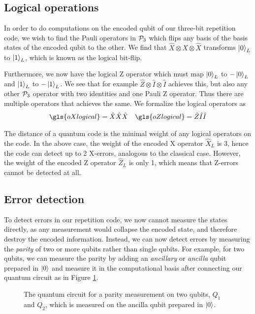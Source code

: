 \subsection{Logical operations}

In order to do computations on the encoded qubit of our three-bit repetition code, we wish to find the Pauli operators in $\mathcal{P}_3$ which flips any basis of the basis states of the encoded qubit to the other. We find that $\hat{X}\otimes \hat{X}\otimes \hat{X}$ transforms $\ket{0}_L$ to $\ket{1}_L$, which is known as the logical bit-flip.

Furthermore, we now have the logical Z operator which must map $\ket{0}_L$ to $-\ket{0}_L$ and $\ket{1}_L$ to $-\ket{1}_L$. We see that for example $\hat{Z}\otimes \hat{I}\otimes \hat{I}$ achieves this, but also any other $\mathcal{P}_3$ operator with two identities and one Pauli Z operator. Thus there are multiple operators that achieves the same. We formalize the logical operators as
\begin{align}\label{eq:qec_3bitlogical}
  \gls{oXlogical} = \hat{X}\hat{X}\hat{X} && \gls{oZlogical} = \hat{Z}\hat{I}\hat{I}
\end{align}

The distance of a quantum code is the minimal weight of any logical operators on the code. In the above case, the weight of the encoded X operator $\hat{X}_L$ is 3, hence the code can detect up to 2 X-errors, analogous to the classical case. However, the weight of the encoded Z operator $\hat{Z}_L$ is only 1, which means that Z-errors cannot be detected at all.

\subsection{Error detection}

To detect errors in our repetition code, we now cannot measure the states directly, as any measurement would collapse the encoded state, and therefore destroy the encoded information. Instead, we can now detect errors by measuring the \emph{parity} of two or more qubits rather than single qubits. For example, for two qubits, we can measure the parity by adding an \emph{ancillary} or \emph{ancilla} qubit prepared in $\ket{0}$ and measure it in the computational basis after connecting our quantum circuit as in Figure \ref{fig:2qubitparity}. 

\begin{figure}[htbp]
  \centering
  \caption{The quantum circuit for a parity measurement on two qubits, $Q_1$ and $Q_2$, which is measured on the ancilla qubit prepared in $\ket{0}$.}\label{fig:2qubitparity}
\end{figure}

